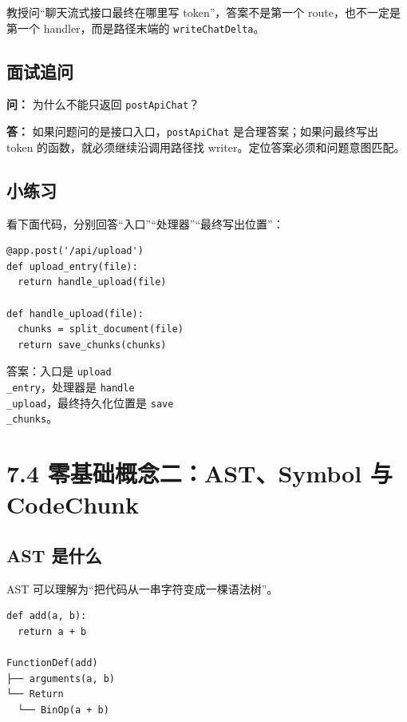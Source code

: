 \documentclass[UTF8,12pt,openany]{ctexbook}
\begin{document}
教授问“聊天流式接口最终在哪里写 token”，答案不是第一个 route，也不一定是第一个 handler，而是路径末端的 \texttt{writeChatDelta}。\par

\subsection{面试追问}

\textbf{问：} 为什么不能只返回 \texttt{postApiChat}？\par

\textbf{答：} 如果问题问的是接口入口，\texttt{postApiChat} 是合理答案；如果问最终写出 token 的函数，就必须继续沿调用路径找 writer。定位答案必须和问题意图匹配。\par

\subsection{小练习}

看下面代码，分别回答“入口”“处理器”“最终写出位置”：\par

\begin{lstlisting}
@app.post('/api/upload')
def upload_entry(file):
  return handle_upload(file)

def handle_upload(file):
  chunks = split_document(file)
  return save_chunks(chunks)
\end{lstlisting}

答案：入口是 \texttt{upload\\_entry}，处理器是 \texttt{handle\\_upload}，最终持久化位置是 \texttt{save\\_chunks}。\par

\section{7.4 零基础概念二：AST、Symbol 与 CodeChunk}

\subsection{AST 是什么}

AST 可以理解为“把代码从一串字符变成一棵语法树”。\par

\begin{lstlisting}
def add(a, b):
  return a + b

FunctionDef(add)
├── arguments(a, b)
└── Return
  └── BinOp(a + b)
\end{lstlisting}
\end{document}
